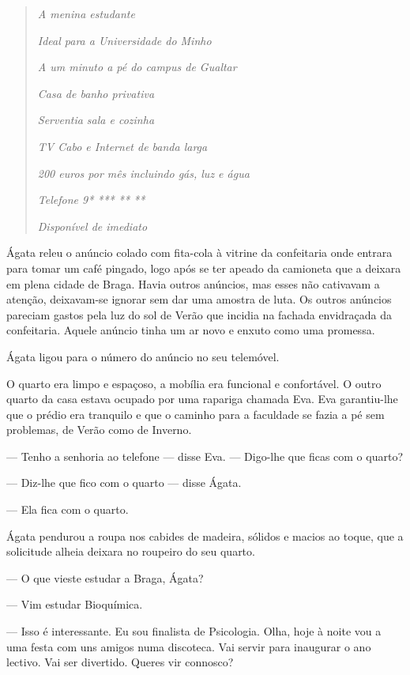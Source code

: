\begin{quotation}

\emph{A menina estudante}

\emph{Ideal para a Universidade do Minho}

\emph{A um minuto a pé do campus de
Gualtar}

\emph{Casa de banho privativa}

\emph{Serventia sala e cozinha}

\emph{TV Cabo e Internet de banda larga}

\emph{200 euros por mês incluindo gás,
luz e água}

\emph{Telefone 9* *** ** **}

\emph{Disponível de imediato}
\end{quotation}

Ágata releu o anúncio colado com fita-cola à vitrine da confeitaria onde
entrara para tomar um café pingado, logo após se ter apeado da camioneta
que a deixara em plena cidade de Braga. Havia outros anúncios, mas esses
não cativavam a atenção, deixavam-se ignorar sem dar uma amostra de
luta. Os outros anúncios pareciam gastos pela luz do sol de Verão que
incidia na fachada envidraçada da confeitaria. Aquele anúncio tinha um
ar novo e enxuto como uma promessa.


Ágata ligou para o número do anúncio no seu telemóvel.

O quarto era limpo e espaçoso, a mobília era funcional e confortável. O
outro quarto da casa estava ocupado por uma rapariga chamada Eva. Eva
garantiu-lhe que o prédio era tranquilo e que o caminho para a
faculdade se fazia a pé sem problemas, de Verão como de Inverno.

--- Tenho a senhoria ao telefone --- disse Eva. --- Digo-lhe que ficas com
  o quarto?

--- Diz-lhe que fico com o quarto --- disse Ágata.

--- Ela fica com o quarto.

Ágata pendurou a roupa nos cabides de madeira, sólidos e macios ao
toque, que a solicitude alheia deixara no roupeiro do seu quarto.

--- O que vieste estudar a Braga, Ágata?

--- Vim estudar Bioquímica.

--- Isso é interessante. Eu sou finalista de Psicologia. Olha, hoje à
  noite vou a uma festa com uns amigos numa discoteca. Vai servir para
  inaugurar o ano lectivo. Vai ser divertido. Queres vir connosco?


